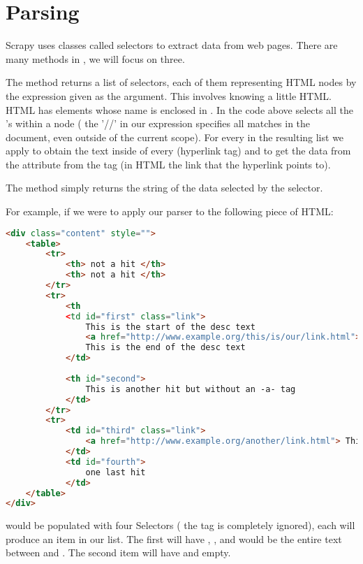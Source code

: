 \section*{Parsing}
Scrapy uses classes called selectors to extract data from web pages.
There are many methods in , we will focus on three.

The  method returns a list of selectors, each of them representing HTML nodes by the expression given as the argument. 
This involves knowing a little HTML. 
HTML has elements whose name is enclosed in \li{<>}. 
In the code above  selects  all the 's within a  node ( the '//' in our expression specifies all matches in the document, even outside of the current scope). 
For every  in the resulting list we apply  to obtain the text inside of every  (hyperlink tag) and  to get the data from the  attribute from the  tag (in HTML the link that the hyperlink points to). 

The  method simply returns the string of the data selected by the selector.

For example, if we were to apply our parser to the following piece of HTML:
\begin{lstlisting}[language=HTML]
<div class="content" style="">
    <table>
        <tr>
            <th> not a hit </th>
            <th> not a hit </th>
        </tr>
        <tr>
            <th
            <td id="first" class="link">
                This is the start of the desc text
                <a href="http://www.example.org/this/is/our/link.html"> This is our link text</a>
                This is the end of the desc text
            </td>
        
            <th id="second">
                This is another hit but without an -a- tag
            </td>
        </tr>
        <tr>
            <td id="third" class="link">
                <a href="http://www.example.org/another/link.html"> This is our link text</a>
            </td>
            <td id="fourth">
                one last hit
            </td>
    </table>
</div>
\end{lstlisting}
 would be populated with four Selectors ( the  tag is completely ignored), each will produce an item in our  list. 
The first will have , , and  would be the entire text between  and . 
The second item will have  and  empty.

